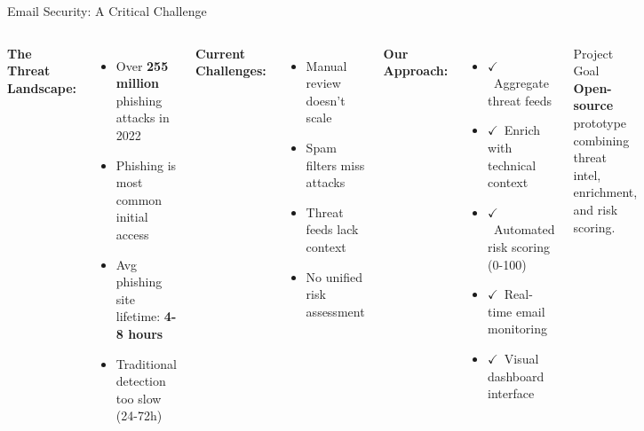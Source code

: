 \documentclass[aspectratio=169]{beamer}
\newcommand{\cmark}{\textcolor{lowgreen}{$\checkmark$}}
\begin{document}
\begin{frame}{Email Security: A Critical Challenge}
\begin{columns}[T]
\small
\textbf{The Threat Landscape:}
\begin{itemize}
    \item Over \textbf{255 million} phishing attacks in 2022
    \item Phishing is most common initial access
    \item Avg phishing site lifetime: \textbf{4-8 hours}
    \item Traditional detection too slow (24-72h)
\end{itemize}

\vspace{0.3cm}
\textbf{Current Challenges:}
\begin{itemize}
    \item Manual review doesn't scale
    \item Spam filters miss attacks
    \item Threat feeds lack context
    \item No unified risk assessment
\end{itemize}

\small
\textbf{Our Approach:}
\begin{itemize}
    \item \cmark\ Aggregate threat feeds
    \item \cmark\ Enrich with technical context
    \item \cmark\ Automated risk scoring (0-100)
    \item \cmark\ Real-time email monitoring
    \item \cmark\ Visual dashboard interface
\end{itemize}

\vspace{0.1cm}
\begin{block}{Project Goal}
\scriptsize
\textbf{Open-source} prototype combining threat intel, enrichment, and risk scoring.
\end{block}
\end{columns}
\end{frame}
\end{document}
